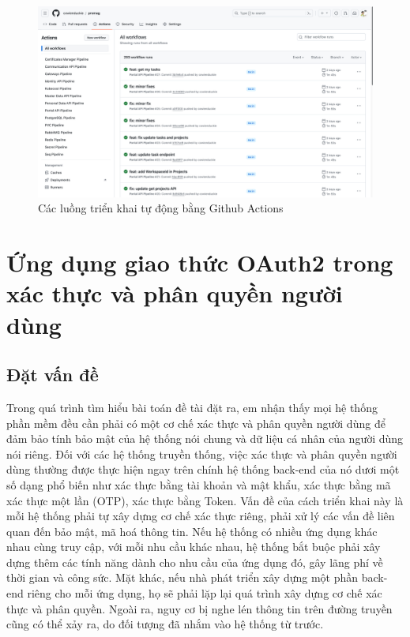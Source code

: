 \documentclass[../DoAn.tex]{subfiles}
\begin{document}
\begin{figure}[H]
    \centering
    \includegraphics[width=1.0\linewidth]{Hinhve/Result_GithubAction.png}
    \caption{Các luồng triển khai tự động bằng Github Actions}
    \label{fig:Result_GithubAction}
\end{figure}

\newpage

\section{Ứng dụng giao thức OAuth2 trong xác thực và phân quyền người dùng}
\label{section:5.2}

\subsection{Đặt vấn đề}
\label{subsection:5.2.1}

Trong quá trình tìm hiểu bài toán đề tài đặt ra, em nhận thấy mọi hệ thống phần mềm đều cần phải có một cơ chế xác thực và phân quyền người dùng để đảm bảo tính bảo mật
của hệ thống nói chung và dữ liệu cá nhân của người dùng nói riêng. Đối với các hệ thống truyền thống, việc xác thực và phân quyền người dùng thường được thực hiện
ngay trên chính hệ thống back-end của nó dươi một số dạng phổ biến như xác thực bằng tài khoản và mật khẩu, xác thực bằng mã xác thực một lần (OTP), xác thực bằng
Token. Vấn đề của cách triển khai này là mỗi hệ thống phải tự xây dựng cơ chế xác thực riêng, phải xử lý các vấn đề liên quan đến bảo mật, mã hoá thông tin.
Nếu hệ thống có nhiều ứng dụng khác nhau cùng truy cập, với mỗi nhu cầu khác nhau, hệ thống bắt buộc phải xây dựng thêm các tính năng dành cho nhu cầu của ứng dụng đó,
gây lãng phí về thời gian và công sức. Mặt khác, nếu nhà phát triển xây dựng một phần back-end riêng cho mỗi ứng dụng, họ sẽ phải lặp lại quá trình xây dựng cơ chế xác thực và phân quyền.
Ngoài ra, nguy cơ bị nghe lén thông tin trên đường truyền cũng có thể xảy ra, do đối tượng đã nhắm vào hệ thống từ trước.
\end{document}

